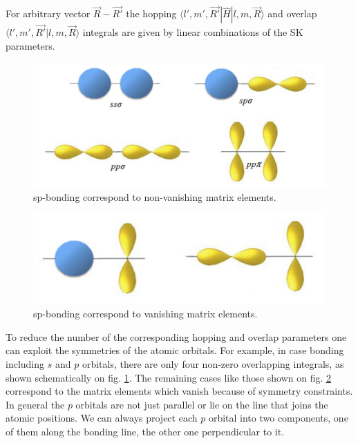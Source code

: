 For arbitrary vector $\vec{R} - \vec{R'} $ the hopping $\langle l', m', \vec{R'} | \hat{H} | l,m,\vec{R} \rangle$ and overlap $\langle l', m', \vec{R'} | l,m,\vec{R} \rangle$ integrals are given by linear combinations of the SK parameters. 

\begin{figure}[h]
  \includegraphics[width=\linewidth]{img/sp_bonding}
  \caption[caption]{sp-bonding correspond to non-vanishing matrix elements. \footnotemark\label{fig:sp} }
\end{figure}
\begin{figure}[h]  
  \includegraphics[width=\linewidth]{img/sp_vanishing}
  \caption[caption]{sp-bonding correspond to vanishing matrix elements.\footnotemark \label{fig:sp_vanishing}}
\end{figure}

To reduce the number of the corresponding hopping and overlap parameters one can exploit the symmetries of the atomic orbitals. For example, in case bonding including $s$ and $p$ orbitals, there are only four non-zero overlapping integrals, as shown schematically on fig. \ref{fig:sp}. The remaining cases like those shown on fig. \ref{fig:sp_vanishing} correspond to the matrix elements which vanish because of symmetry constraints. In general the $p$ orbitals are not just parallel or lie on the line that joins the atomic positions. We can always project each $p$ orbital into two components, one of them along the bonding line, the other one perpendicular to it. 

